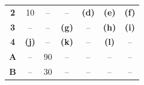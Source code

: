 \documentclass[calculator,steamtables,refrigeranttables,psychrometricchart,datasheet]{exam}
\begin{document}
\begin{question}
\begin{enumerate}[(i)]
\begin{center}
\begin{tabular} {||c | c c c c c c || }
 {\bf 2 }   & 10         &  --            &   --           & {\bf (d)}           & {\bf (e)}           & {\bf (f)}                 \\
 {\bf 3 }   & --         & --             &   {\bf (g)}    & --                  & {\bf (h)}           & {\bf (i)}                \\
 {\bf 4 }   & {\bf (j)}  & --             &   {\bf (k)}    & --                  & {\bf (l)}           & --                      \\
 {\bf A }   & --         & 90             &   --           & --                  & --                  & --                       \\
 {\bf B }   & --         & 30             &   --           & --                  & --                  & --                       \\
 \hline\hline
\end{tabular}
\end{center}


\end{enumerate}
\end{question}
\end{document}
